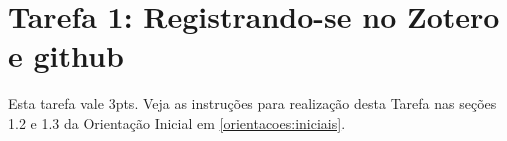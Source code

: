 \chapter{Tarefa 1: Registrando-se no Zotero e github}

Esta tarefa vale 3pts. Veja as instruções para realização desta Tarefa nas seções 1.2 e 1.3 da Orientação Inicial em \ref{orientacoes:iniciais}.